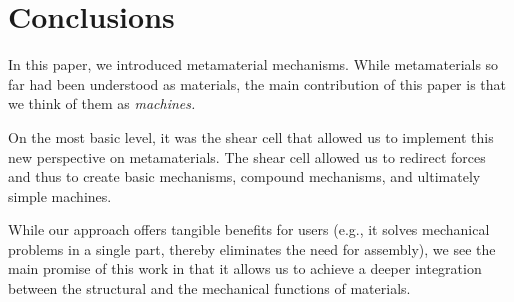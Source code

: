 \section{Conclusions}
In this paper, we introduced metamaterial mechanisms. While metamaterials so far had been understood as materials, the main contribution of this paper is that we think of them as \textit{machines.}

On the most basic level, it was the shear cell that allowed us to implement this new perspective on metamaterials. The shear cell allowed us to redirect forces and thus to create basic mechanisms, compound mechanisms, and ultimately simple machines.

While our approach offers tangible benefits for users (e.g., it solves mechanical problems in a single part, thereby eliminates the need for assembly), we see the main promise of this work in that it allows us to achieve a deeper integration between the structural and the mechanical functions of materials.


